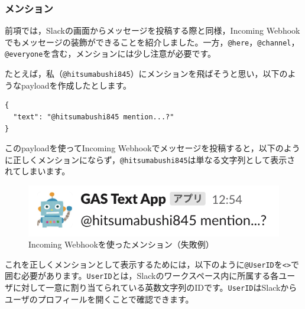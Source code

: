 \documentclass[uplatex,a4j]{jsarticle}
\begin{document}
\subsubsection{メンション}

前項では，Slackの画面からメッセージを投稿する際と同様，Incoming Webhookでもメッセージの装飾ができることを紹介しました。一方，\verb|@here|，\verb|@channel|，\verb|@everyone|を含む，メンションには少し注意が必要です。


たとえば，私（\verb|@hitsumabushi845|）にメンションを飛ばそうと思い，以下のようなpayloadを作成したとします。

\begin{lstlisting}[basicstyle=\ttfamily\footnotesize,frame=single,caption=mention payload sample1,label=mrkdwnmentionpayloadfailed]
{
  "text": "@hitsumabushi845 mention...?"
}
\end{lstlisting}

このpayloadを使ってIncoming Webhookでメッセージを投稿すると，以下のように正しくメンションにならず，\verb|@hitsumabushi845|は単なる文字列として表示されてしまいます。

\begin{figure}[H]
 \centering
 \includegraphics[keepaspectratio, scale=0.8]{images/mention1.png}
 \caption{Incoming Webhookを使ったメンション（失敗例）}
 \label{fig:mention1}
\end{figure}

これを正しくメンションとして表示するためには，以下のように\verb|@UserID|を\verb|<>|で囲む必要があります。\verb|UserID|とは，Slackのワークスペース内に所属する各ユーザに対して一意に割り当てられている英数文字列のIDです。\verb|UserID|はSlackからユーザのプロフィールを開くことで確認できます。
\end{document}
